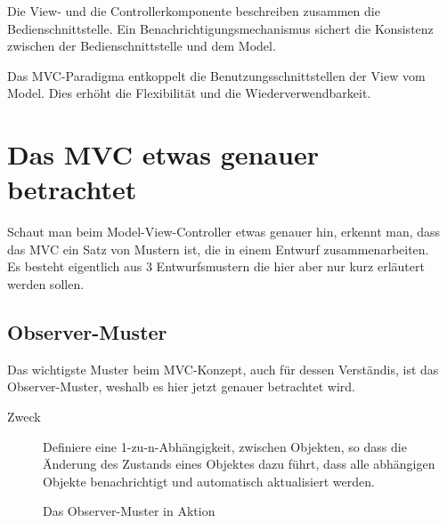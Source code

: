 \documentclass[11pt,a4paper,titlepage]{scrreprt}
\begin{document}
Die View- und die Controllerkomponente beschreiben zusammen die Bedienschnittstelle.
Ein Benachrichtigungsmechanismus sichert die Konsistenz zwischen der Bedienschnittstelle
und dem Model.

Das MVC-Paradigma entkoppelt die Benutzungsschnittstellen der View vom Model. Dies
erhöht die Flexibilität und die Wiederverwendbarkeit.

\section{Das MVC etwas genauer betrachtet}
Schaut man beim Model-View-Controller etwas genauer hin, erkennt man, dass das MVC
ein Satz von Mustern ist, die in einem Entwurf zusammenarbeiten.\\
Es besteht eigentlich aus 3 Entwurfsmustern die hier aber nur kurz erläutert werden
sollen.

\subsection{Observer-Muster}
Das wichtigste Muster beim MVC-Konzept, auch für dessen Verständis, ist das Observer-Muster,
weshalb es hier jetzt genauer betrachtet wird.

\begin{description}
\item[Zweck]
Definiere eine 1-zu-n-Abhängigkeit, zwischen Objekten, so dass die Änderung des
Zustands eines Objektes dazu führt, dass alle abhängigen Objekte benachrichtigt
und automatisch aktualisiert werden. \citep[S. 287]{Riehle200407}
\end{description}

\enlargethispage{1cm}
\begin{figure}[h]
\caption{Das Observer-Muster in Aktion}
\end{figure}
\end{document}
